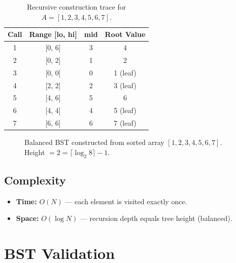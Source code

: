 \documentclass[10pt,journal,compsoc,onecolumn]{IEEEtran}
\begin{document}
\begin{table}[htbp]
\centering
\begin{tabular}{|c|c|c|c|}
\hline
\textbf{Call} & \textbf{Range [lo, hi]} & \textbf{mid} & \textbf{Root Value} \\
\hline
1 & [0, 6] & 3 & 4 \\
2 & [0, 2] & 1 & 2 \\
3 & [0, 0] & 0 & 1 (leaf) \\
4 & [2, 2] & 2 & 3 (leaf) \\
5 & [4, 6] & 5 & 6 \\
6 & [4, 4] & 4 & 5 (leaf) \\
7 & [6, 6] & 6 & 7 (leaf) \\
\hline
\end{tabular}
\caption{Recursive construction trace for $A = [1,2,3,4,5,6,7]$.}
\end{table}

\begin{figure}[htbp]
\centering
{}
\caption{Balanced BST constructed from sorted array $[1,2,3,4,5,6,7]$. Height $= 2 = \lceil\log_2 8\rceil - 1$.}
\end{figure}

\subsection{Complexity}

\begin{itemize}
    \item \textbf{Time:} $O(N)$ --- each element is visited exactly once.
    \item \textbf{Space:} $O(\log N)$ --- recursion depth equals tree height (balanced).
\end{itemize}

\section{BST Validation}
\label{sec:validate}
\end{document}
